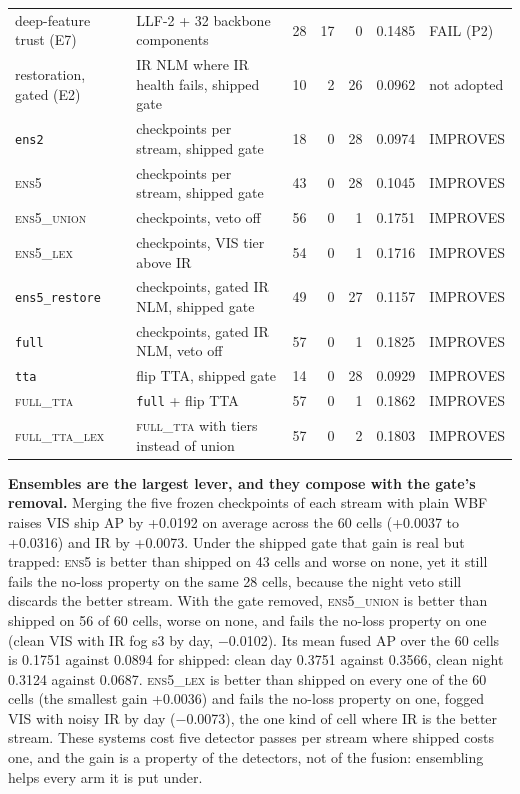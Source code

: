 \documentclass[10pt]{article}
\begin{document}
\begin{table}[htbp]
\begin{tabularx}{\linewidth}{l>{\raggedright\arraybackslash}Xrrrrl}
deep-feature trust (E7) & LLF-2 + 32 backbone components & 28 & 17 & 0 & 0.1485 & FAIL (P2) \\
restoration, gated (E2) & IR NLM where IR health fails, shipped gate & 10 & 2 & 26 & 0.0962 & not adopted \\
\texttt{ens2} & 2 checkpoints per stream, shipped gate & 18 & 0 & 28 & 0.0974 & IMPROVES \\
\textsc{ens5} & 5 checkpoints per stream, shipped gate & 43 & 0 & 28 & 0.1045 & IMPROVES \\
\textsc{ens5\_union} & 5 checkpoints, veto off & 56 & 0 & 1 & 0.1751 & IMPROVES \\
\textsc{ens5\_lex} & 5 checkpoints, VIS tier above IR & 54 & 0 & 1 & 0.1716 & IMPROVES \\
\texttt{ens5\_\allowbreak{}restore} & 5 checkpoints, gated IR NLM, shipped gate & 49 & 0 & 27 & 0.1157 & IMPROVES \\
\texttt{full} & 5 checkpoints, gated IR NLM, veto off & 57 & 0 & 1 & 0.1825 & IMPROVES \\
\texttt{tta} & flip TTA, shipped gate & 14 & 0 & 28 & 0.0929 & IMPROVES \\
\textsc{full\_tta} & \texttt{full} + flip TTA & 57 & 0 & 1 & 0.1862 & IMPROVES \\
\textsc{full\_tta\_lex} & \textsc{full\_tta} with tiers instead of union & 57 & 0 & 2 & 0.1803 & IMPROVES \\
\bottomrule
\end{tabularx}
\end{table}
\textbf{Ensembles are the largest lever, and they compose with the gate's removal.} Merging the five frozen checkpoints of each stream with plain WBF raises VIS ship AP by +0.0192 on average across the 60 cells (+0.0037 to +0.0316) and IR by +0.0073. Under the shipped gate that gain is real but trapped: \textsc{ens5} is better than shipped on 43 cells and worse on none, yet it still fails the no-loss property on the same 28 cells, because the night veto still discards the better stream. With the gate removed, \textsc{ens5\_union} is better than shipped on 56 of 60 cells, worse on none, and fails the no-loss property on one (clean VIS with IR fog s3 by day, $-$0.0102). Its mean fused AP over the 60 cells is 0.1751 against 0.0894 for shipped: clean day 0.3751 against 0.3566, clean night 0.3124 against 0.0687. \textsc{ens5\_lex} is better than shipped on every one of the 60 cells (the smallest gain +0.0036) and fails the no-loss property on one, fogged VIS with noisy IR by day ($-$0.0073), the one kind of cell where IR is the better stream. These systems cost five detector passes per stream where shipped costs one, and the gain is a property of the detectors, not of the fusion: ensembling helps every arm it is put under.
\end{document}
